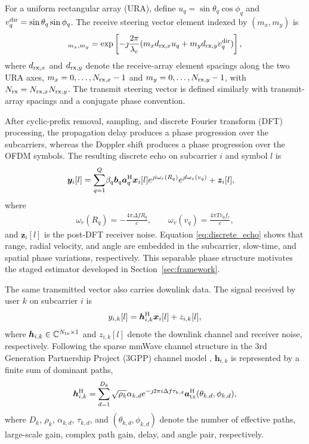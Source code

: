 \documentclass[conference]{IEEEtran}
\begin{document}
For a uniform rectangular array (URA), define $u_q=\sin\theta_q\cos\phi_q$ and $v_q^{\rm dir}=\sin\theta_q\sin\phi_q$. The receive steering vector element indexed by $(m_x,m_y)$ is
\begin{align}
    [\bm{b}_q]_{m_x,m_y}
    =\exp\left[-\jmath\frac{2\pi}{\lambda_c}
    (m_xd_{{\rm rx},x}u_q+m_yd_{{\rm rx},y}v_q^{\rm dir})\right],
    \label{eq:rx_steering}
\end{align}
where $d_{{\rm rx},x}$ and $d_{{\rm rx},y}$ denote the receive-array element spacings along the two URA axes, $m_x=0,\ldots,N_{{\rm rx},x}-1$ and $m_y=0,\ldots,N_{{\rm rx},y}-1$, with $N_{\rm rx}=N_{{\rm rx},x}N_{{\rm rx},y}$. The transmit steering vector is defined similarly with transmit-array spacings and a conjugate phase convention.

After cyclic-prefix removal, sampling, and discrete Fourier transform (DFT) processing, the propagation delay produces a phase progression over the subcarriers, whereas the Doppler shift produces a phase progression over the OFDM symbols. The resulting discrete echo on subcarrier $i$ and symbol $l$ is
\begin{align}
 \bm{y}_i[l]
 =\sum_{q=1}^{Q}&\beta_q\bm{b}_q\bm{a}_q^{\rm H}\bm{x}_i[l]
 e^{\jmath i\omega_r(R_q)}e^{\jmath l\omega_v(v_q)}
 +\bm{z}_i[l],
 \label{eq:discrete_echo}
\end{align}
where
\begin{align}
    \omega_r(R_q)=-\frac{4\pi\Delta f R_q}{c},\qquad
    \omega_v(v_q)=\frac{4\pi T v_q f_c}{c},
    \label{eq:phase_mapping}
\end{align}
and $\bm{z}_i[l]$ is the post-DFT receiver noise. Equation \eqref{eq:discrete_echo} shows that range, radial velocity, and angle are embedded in the subcarrier, slow-time, and spatial phase variations, respectively. This separable phase structure motivates the staged estimator developed in Section~\ref{sec:framework}.

The same transmitted vector also carries downlink data. The signal received by user $k$ on subcarrier $i$ is
\begin{align}
    y_{i,k}[l]=\bm{h}_{i,k}^{\rm H}\bm{x}_i[l]+z_{i,k}[l],
    \label{eq:comm_model}
\end{align}
where $\bm{h}_{i,k}\in\mathbb{C}^{N_{\rm tx}\times1}$ and $z_{i,k}[l]$ denote the downlink channel and receiver noise, respectively. Following the sparse mmWave channel structure in the 3rd Generation Partnership Project (3GPP) channel model \cite{3gpp38901}, $\bm{h}_{i,k}$ is represented by a finite sum of dominant paths,
\begin{align}
    \bm{h}_{i,k}^{\rm H}=
    \sum_{d=1}^{D_k}\sqrt{\rho_k}\alpha_{k,d}e^{-\jmath 2\pi i\Delta f\tau_{k,d}}
    \bm{a}_{\rm tx}^{\rm H}(\theta_{k,d},\phi_{k,d}),
    \label{eq:comm_channel}
\end{align}
where $D_k$, $\rho_k$, $\alpha_{k,d}$, $\tau_{k,d}$, and $(\theta_{k,d},\phi_{k,d})$ denote the number of effective paths, large-scale gain, complex path gain, delay, and angle pair, respectively.
\end{document}
